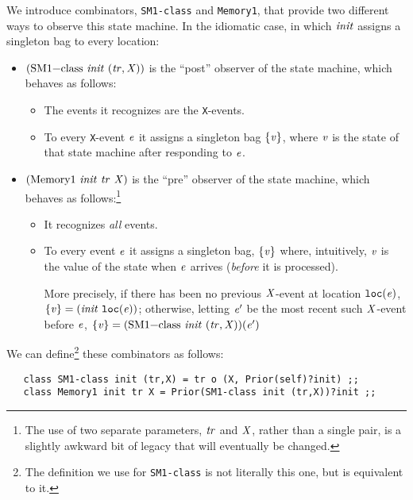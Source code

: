 \documentclass[final]{article}
\newcommand{\listinline}[1]{\text{\lstinline{#1}}}
\begin{document}
We introduce combinators, \lstinline{SM1-class} and
\lstinline{Memory1},
%
%
%
%
that provide two different ways to observe this
state machine.  In the idiomatic case, in which
$\mathit{init}$ assigns a singleton bag to every location:
\begin{itemize}
\item
$(\listinline{SM1-class}~\NUPRL{init}~(\NUPRL{tr},\NUPRL{X}))$ is the
``post'' observer of the state machine, which behaves as follows:
  \begin{itemize}
  \item
  The events it recognizes are the \lstinline{X}-events.
  \item
  To every \lstinline{X}-event $\mathit{e}$ it assigns a singleton
  bag $\{\mathit{v}\}$, where $\mathit{v}$ is the state of that state
  machine after responding to $\mathit{e}$.
  \end{itemize}
\item
$(\listinline{Memory1}~\NUPRL{init}~\NUPRL{tr}~\NUPRL{X})$ is the
``pre'' observer of the state machine, which behaves as
  follows:\footnote{The use of two separate parameters, $\mathit{tr}$ and
    $\mathit{X}$, rather than a single pair, is a slightly awkward bit
    of legacy that will eventually be changed.}
  \begin{itemize}
  \item
  It recognizes \emph{all} events.
  \item
  To every event $\mathit{e}$ it assigns a singleton bag,
  $\{\mathit{v}\}$ where, intuitively, $\mathit{v}$ is the value of the
  state when $\mathit{e}$ arrives (\emph{before} it is processed).

  More precisely, if there has been no previous $\mathit{X}$-event at
  location $\mathtt{loc}(\mathit{e})$,
  $\{\mathit{v}\}=(\mathit{init}~\mathtt{loc}(\mathit{e}))$; otherwise, letting
  $\mathit{e}'$ be the most recent such $\mathit{X}$-event before
  $\mathit{e}$,
  $\{\NUPRL{v}\} =
    (\listinline{SM1-class}~\NUPRL{init}~(\NUPRL{tr},\NUPRL{X}))(\NUPRLevent')$
  \end{itemize}
\end{itemize}


\noindent We can define\footnote{The definition we use for
  \lstinline{SM1-class} is not literally this one, but is
  equivalent to it.} these combinators as follows:
\begin{emlcode}
\begin{lstlisting}
   class SM1-class init (tr,X) = tr o (X, Prior(self)?init) ;;
   class Memory1 init tr X = Prior(SM1-class init (tr,X))?init ;;
\end{lstlisting}
\end{emlcode}
\end{document}
